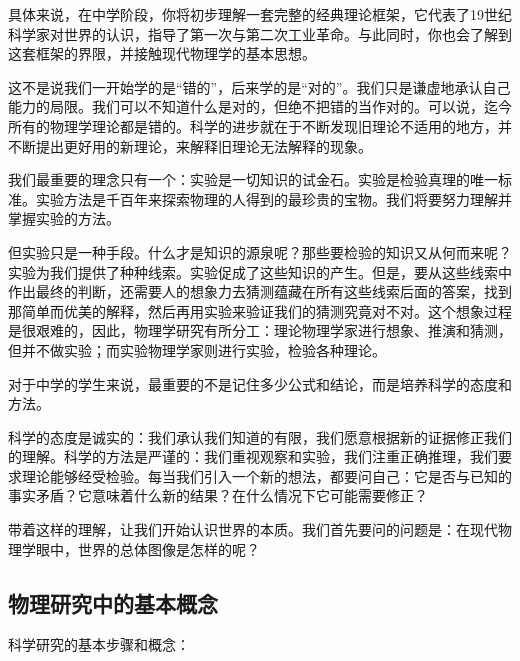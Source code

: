 \documentclass[12pt,UTF8,fontset=none]{ctexbook}
\begin{document}
具体来说，在中学阶段，你将初步理解一套完整的经典理论框架，它代表了19世纪科学家对世界的认识，指导了第一次与第二次工业革命。与此同时，你也会了解到这套框架的界限，并接触现代物理学的基本思想。

这不是说我们一开始学的是“错的”，后来学的是“对的”。我们只是谦虚地承认自己能力的局限。我们可以不知道什么是对的，但绝不把错的当作对的。可以说，迄今所有的物理学理论都是错的。科学的进步就在于不断发现旧理论不适用的地方，并不断提出更好用的新理论，来解释旧理论无法解释的现象。

我们最重要的理念只有一个：实验是一切知识的试金石。实验是检验真理的唯一标准。实验方法是千百年来探索物理的人得到的最珍贵的宝物。我们将要努力理解并掌握实验的方法。

但实验只是一种手段。什么才是知识的源泉呢？那些要检验的知识又从何而来呢？实验为我们提供了种种线索。实验促成了这些知识的产生。但是，要从这些线索中作出最终的判断，还需要人的想象力去猜测蕴藏在所有这些线索后面的答案，找到那简单而优美的解释，然后再用实验来验证我们的猜测究竟对不对。这个想象过程是很艰难的，因此，物理学研究有所分工：理论物理学家进行想象、推演和猜测，但并不做实验；而实验物理学家则进行实验，检验各种理论。

对于中学的学生来说，最重要的不是记住多少公式和结论，而是培养科学的态度和方法。

科学的态度是诚实的：我们承认我们知道的有限，我们愿意根据新的证据修正我们的理解。科学的方法是严谨的：我们重视观察和实验，我们注重正确推理，我们要求理论能够经受检验。每当我们引入一个新的想法，都要问自己：它是否与已知的事实矛盾？它意味着什么新的结果？在什么情况下它可能需要修正？

带着这样的理解，让我们开始认识世界的本质。我们首先要问的问题是：在现代物理学眼中，世界的总体图像是怎样的呢？

\subsection{物理研究中的基本概念}

科学研究的基本步骤和概念：
\end{document}
